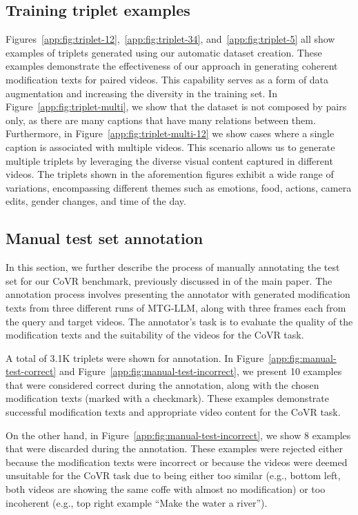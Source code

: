 \subsection{Training triplet examples}
\label{app:subsec:qualitative_triplets}
Figures~\ref{app:fig:triplet-12},~\ref{app:fig:triplet-34}, and~\ref{app:fig:triplet-5} 
all show examples of triplets generated using our automatic dataset creation.
These examples demonstrate the effectiveness of our approach 
in generating coherent modification texts for paired videos.
This capability serves as a form of data augmentation and increasing the diversity in the training set.
In Figure~\ref{app:fig:triplet-multi}, we show that the dataset is not composed by pairs only,
as there are many captions that have many relations between them.
Furthermore, in Figure~\ref{app:fig:triplet-multi-12} we show cases where 
a single caption is associated with multiple videos. 
This scenario allows us to generate multiple triplets by leveraging the 
diverse visual content captured in different videos.
The triplets shown in the aforemention figures exhibit a wide range of variations, 
encompassing different themes such as
emotions, food, actions, camera edits, gender changes, and time of the day. 

\subsection{Manual test set annotation}
\label{app:subsec:manual}
In this section, we further describe the process of manually annotating the test set
for our \ourDSm CoVR benchmark, previously discussed in
\if{} \fi
of the main paper.
The annotation process involves presenting the annotator 
with generated modification texts from three different runs of MTG-LLM, 
along with three frames each from the query and target videos. The annotator's task is to evaluate the quality of the modification texts and the suitability of the videos for the CoVR task.

A total of 3.1K triplets were shown for annotation.
In Figure~\ref{app:fig:manual-test-correct} and Figure~\ref{app:fig:manual-test-incorrect}, 
we present 10 examples that were considered correct during the annotation, along with the chosen modification texts (marked with a checkmark). 
These examples demonstrate successful modification texts and appropriate video content for the CoVR task.

On the other hand, in Figure~\ref{app:fig:manual-test-incorrect}, 
we show 8 examples that were discarded during the annotation. 
These examples were rejected either because the modification texts were incorrect 
or because the videos were deemed unsuitable for the CoVR task due to being either 
too similar ({e.g., bottom left, both videos are showing the same coffe with almost no modification}) or too incoherent ({e.g., top right example ``Make the water a river''}).

